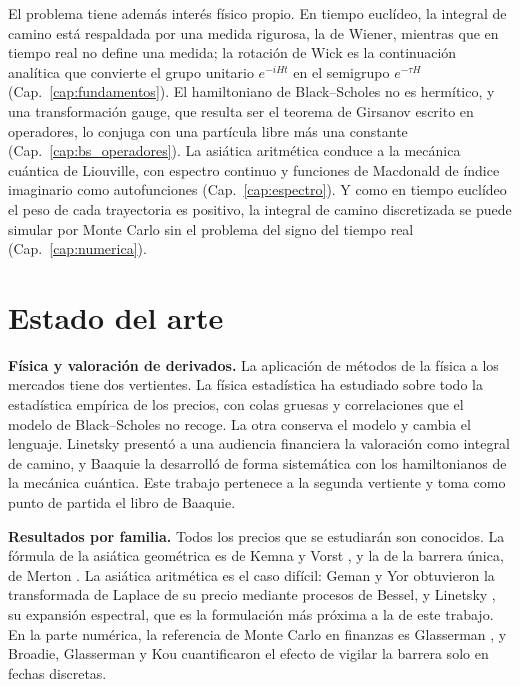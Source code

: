 El problema tiene además interés físico propio. En tiempo euclídeo, la
integral de camino está respaldada por una medida rigurosa, la de
Wiener, mientras que en tiempo real no define una medida; la rotación de
Wick es la continuación analítica que convierte el grupo unitario
$e^{-iHt}$ en el semigrupo $e^{-\tau H}$
(Cap.~\ref{cap:fundamentos}\enprep). El hamiltoniano de Black--Scholes
no es hermítico, y una transformación gauge, que resulta ser el teorema
de Girsanov escrito en operadores, lo conjuga con una partícula libre
más una constante (Cap.~\ref{cap:bs_operadores}\enprep). La asiática
aritmética conduce a la mecánica cuántica de Liouville, con espectro
continuo y funciones de Macdonald de índice imaginario como
autofunciones (Cap.~\ref{cap:espectro}\enprep). Y como en tiempo
euclídeo el peso de cada trayectoria es positivo, la integral de camino
discretizada se puede simular por Monte Carlo sin el problema del signo
del tiempo real (Cap.~\ref{cap:numerica}\enprep).

\section{Estado del arte}
\label{sec:estado_arte}

\noindent\textbf{Física y valoración de derivados.}
La aplicación de métodos de la física a los mercados tiene dos
vertientes. La física estadística ha estudiado sobre todo la estadística
empírica de los precios, con colas gruesas y correlaciones que el modelo
de Black--Scholes no recoge. La otra conserva el modelo y cambia el
lenguaje. Linetsky \cite{linetsky1998} presentó a una audiencia
financiera la valoración como integral de camino, y Baaquie
\cite{baaquie2004} la desarrolló de forma sistemática con los
hamiltonianos de la mecánica cuántica. Este trabajo pertenece a la
segunda vertiente y toma como punto de partida el libro de Baaquie.

\medskip

\noindent\textbf{Resultados por familia.}
Todos los precios que se estudiarán son conocidos. La fórmula de la
asiática geométrica es de Kemna y Vorst \cite{kemna-vorst}, y la de la
barrera única, de Merton \cite{merton1973}. La asiática aritmética es el
caso difícil: Geman y Yor \cite{geman-yor} obtuvieron la transformada de
Laplace de su precio mediante procesos de Bessel, y Linetsky
\cite{linetsky2004}, su expansión espectral, que es la formulación más
próxima a la de este trabajo. En la parte numérica, la referencia de
Monte Carlo en finanzas es Glasserman \cite{glasserman}, y Broadie,
Glasserman y Kou \cite{broadie-glasserman-kou} cuantificaron el efecto de
vigilar la barrera solo en fechas discretas.


